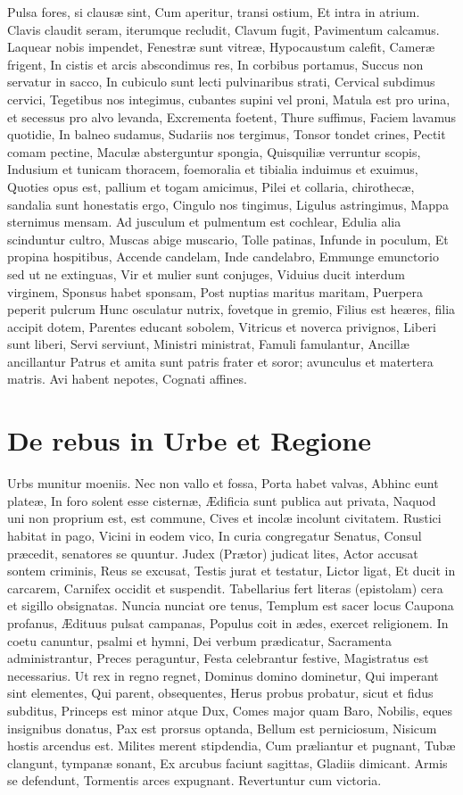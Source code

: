 \documentclass[12pt, twocolumn]{memoir}
\begin{document}
Pulsa fores, si clausæ sint,
Cum aperitur, transi ostium,
Et intra in atrium.
Clavis claudit seram, iterumque recludit,
Clavum fugit,
Pavimentum calcamus. 
Laquear nobis impendet,
Fenestræ sunt vitreæ,
Hypocaustum calefit,
Cameræ frigent,
In cistis et arcis abscondimus res,
In corbibus portamus,
Succus non servatur in sacco,
In cubiculo sunt lecti pulvinaribus strati, 
Cervical subdimus cervici,
Tegetibus nos integimus, cubantes supini vel proni,
Matula est pro urina, et secessus pro alvo levanda,
Excrementa foetent,
Thure suffimus,
Faciem lavamus quotidie,
In balneo sudamus,
Sudariis nos tergimus,
Tonsor tondet crines,
Pectit comam pectine,
Maculæ absterguntur spongia,
Quisquiliæ verruntur scopis,
Indusium et tunicam thoracem, foemoralia et tibialia induimus et exuimus,
Quoties opus est, pallium et togam amicimus,
Pilei et collaria, chirothecæ, sandalia sunt honestatis ergo,
Cingulo nos tingimus,
Ligulus astringimus,
Mappa sternimus mensam.
Ad jusculum et pulmentum est cochlear,
Edulia alia scinduntur cultro,
Muscas abige muscario,
Tolle patinas,
Infunde in poculum,
Et propina hospitibus,
Accende candelam,
Inde candelabro,
Emmunge emunctorio sed ut ne extinguas,
Vir et mulier sunt conjuges,
Viduius ducit interdum virginem,
Sponsus habet sponsam,
Post nuptias maritus maritam,
Puerpera peperit pulcrum
Hunc osculatur nutrix, fovetque in gremio,
Filius est heæres, filia accipit dotem,
Parentes educant sobolem,
Vitricus et noverca privignos,
Liberi sunt liberi,
Servi serviunt,
Ministri ministrat,
Famuli famulantur,
Ancillæ ancillantur
Patrus et amita sunt patris frater et soror; avunculus et matertera matris.
Avi habent nepotes,
Cognati affines.

\chapter{De rebus in Urbe et Regione}

Urbs munitur moeniis.
Nec non vallo et fossa,
Porta habet valvas,
Abhinc eunt plateæ,
In foro solent esse cisternæ,
Ædificia sunt publica aut privata,
Naquod uni non proprium est, est commune,
Cives et incolæ incolunt civitatem.
Rustici habitat in pago,
Vicini in eodem vico,
In curia congregatur Senatus,
Consul præcedit, senatores se quuntur.
Judex (Prætor) judicat lites,
Actor accusat sontem criminis,
Reus se excusat,
Testis jurat et testatur,
Lictor ligat,
Et ducit in carcarem,
Carnifex occidit et suspendit.
Tabellarius fert literas (epistolam) cera et sigillo obsignatas.
Nuncia nunciat ore tenus,
Templum est sacer locus
Caupona profanus,
Ædituus pulsat campanas,
Populus coit in ædes, exercet religionem.
In coetu canuntur, psalmi et hymni,
Dei verbum prædicatur,
Sacramenta administrantur,
Preces peraguntur,
Festa celebrantur festive,
Magistratus est necessarius.
Ut rex in regno regnet,
Dominus domino dominetur,
Qui imperant sint elementes,
Qui parent, obsequentes,
Herus probus probatur, sicut et fidus subditus,
Princeps est minor atque Dux,
Comes major quam Baro,
Nobilis, eques insignibus donatus,
Pax est prorsus optanda,
Bellum est perniciosum,
Nisicum hostis arcendus est.
Milites merent stipdendia,
Cum præliantur et pugnant,
Tubæ clangunt, tympanæ sonant,
Ex arcubus faciunt sagittas,
Gladiis dimicant.
Armis se defendunt,
Tormentis arces expugnant.
Revertuntur cum victoria.
\end{document}
